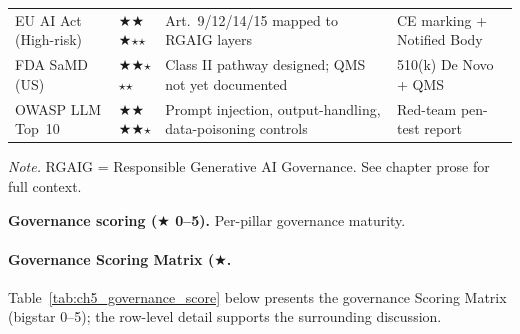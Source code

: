 {\begin{xltabular}{\textwidth}{@{} >{\raggedright\arraybackslash}p{2.6cm} >{\centering\arraybackslash}p{2.0cm} L L @{}}
EU AI Act (High-risk) & $\bigstar$$\bigstar$$\bigstar$$\star$$\star$ & Art.~9/12/14/15 mapped to RGAIG layers & CE marking + Notified Body \\
FDA SaMD (US) & $\bigstar$$\bigstar$$\star$$\star$$\star$ & Class II pathway designed; QMS not yet documented & 510(k) De Novo + QMS \\
OWASP LLM Top~10 & $\bigstar$$\bigstar$$\bigstar$$\bigstar$$\star$ & Prompt injection, output-handling, data-poisoning controls & Red-team pen-test report \\
\end{xltabular}}
\vspace{0.3em}\noindent\textit{Note.} RGAIG = Responsible Generative AI Governance. See chapter prose for full context.

\noindent\textbf{Governance scoring ($\bigstar$ 0--5).} Per-pillar governance maturity.

\paragraph{Governance Scoring Matrix ($\bigstar$.}


\noindent Table~\ref{tab:ch5_governance_score} below presents the governance Scoring Matrix (bigstar 0--5); the row-level detail supports the surrounding discussion.

